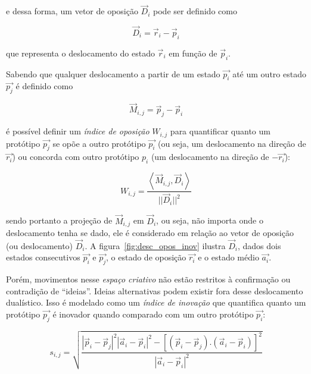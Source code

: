 \noindent e dessa forma, um vetor de oposição $\vec{D}_i$ pode ser definido como

\begin{equation}
\vec{D}_i=\vec{r}_i - \vec{p}_i
\end{equation}

\noindent que representa o deslocamento do estado $\vec{r}_i$ em
função de $\vec{p}_i$.

Sabendo que qualquer deslocamento a partir de um estado $\vec{p_i}$ até um outro
estado $\vec{p_j}$ é definido como

\begin{equation}
\vec{M}_{i,j} = \vec{p}_j - \vec{p}_i
\end{equation}

\noindent é possível definir um \emph{índice de oposição} $W_{i,j}$ para
quantificar quanto um protótipo $\vec{p_j}$ se opõe a outro protótipo $\vec{p_i}$ (ou seja,
um deslocamento na direção de $\vec{r_i}$) ou concorda com outro protótipo $p_i$
(um deslocamento na direção de $-\vec{r_i}$):

\begin{equation}
W_{i,j} = \frac{\left< \vec{M}_{i,j}, \vec{D}_i\right>}{||\vec{D}_i||^2}
\end{equation}

\noindent sendo portanto a projeção de $\vec{M}_{i,j}$ em $\vec{D}_i$, ou seja,
não importa onde o deslocamento tenha se dado, ele é considerado em relação ao
vetor de oposição (ou deslocamento) $\vec{D}_i$. A
figura~\ref{fig:desc_opos_inov} ilustra $\vec{D}_i$, dados dois estados
consecutivos $\vec{p_i}$ e $\vec{p_j}$, o estado de oposição $\vec{r_i}$ e o
estado médio $\vec{a_i}$.

Porém, movimentos nesse \textit{espaço criativo} não estão restritos à
confirmação ou contradição de ``ideias''. Ideias alternativas podem existir fora
desse deslocamento dualístico. Isso é modelado como um \emph{índice de inovação}
que quantifica quanto um protótipo $\vec{p_j}$ é inovador quando comparado com um
outro protótipo $\vec{p_i}$:


\begin{equation}
s_{i,j} = \sqrt{\frac{|\vec{p}_i-\vec{p}_j|^2
          |\vec{a}_i-\vec{p}_i|^2 - 
          [(\vec{p}_i-\vec{p}_j) . 
            (\vec{a}_i-\vec{p}_i)]^2}
        {|\vec{a}_i-\vec{p}_i|^2}}
\end{equation}

